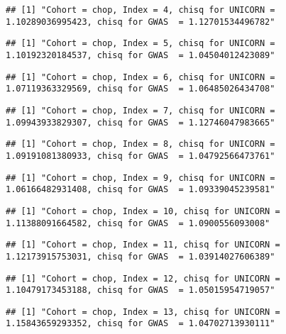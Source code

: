 \documentclass[]{article}
\begin{document}
\begin{verbatim}
## [1] "Cohort = chop, Index = 4, chisq for UNICORN = 1.10289036995423, chisq for GWAS  = 1.12701534496782"
\end{verbatim}

\begin{verbatim}
## [1] "Cohort = chop, Index = 5, chisq for UNICORN = 1.10192320184537, chisq for GWAS  = 1.04504012423089"
\end{verbatim}

\begin{verbatim}
## [1] "Cohort = chop, Index = 6, chisq for UNICORN = 1.07119363329569, chisq for GWAS  = 1.06485026434708"
\end{verbatim}

\begin{verbatim}
## [1] "Cohort = chop, Index = 7, chisq for UNICORN = 1.09943933829307, chisq for GWAS  = 1.12746047983665"
\end{verbatim}

\begin{verbatim}
## [1] "Cohort = chop, Index = 8, chisq for UNICORN = 1.09191081380933, chisq for GWAS  = 1.04792566473761"
\end{verbatim}

\begin{verbatim}
## [1] "Cohort = chop, Index = 9, chisq for UNICORN = 1.06166482931408, chisq for GWAS  = 1.09339045239581"
\end{verbatim}

\begin{verbatim}
## [1] "Cohort = chop, Index = 10, chisq for UNICORN = 1.11388091664582, chisq for GWAS  = 1.0900556093008"
\end{verbatim}

\begin{verbatim}
## [1] "Cohort = chop, Index = 11, chisq for UNICORN = 1.12173915753031, chisq for GWAS  = 1.03914027606389"
\end{verbatim}

\begin{verbatim}
## [1] "Cohort = chop, Index = 12, chisq for UNICORN = 1.10479173453188, chisq for GWAS  = 1.05015954719057"
\end{verbatim}

\begin{verbatim}
## [1] "Cohort = chop, Index = 13, chisq for UNICORN = 1.15843659293352, chisq for GWAS  = 1.04702713930111"
\end{verbatim}
\end{document}
